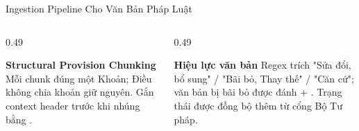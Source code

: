 \documentclass[aspectratio=1610,10pt,xcolor={table}]{beamer}
\begin{document}
\begin{frame}{Ingestion Pipeline Cho Văn Bản Pháp Luật}
  \vspace{0.15cm}
  \begin{columns}[t]
    \begin{column}{0.49\textwidth}
      \begin{block}{\textbf{Structural Provision Chunking}}
        \scriptsize Mỗi chunk đúng một Khoản; Điều không chia khoản giữ nguyên. Gắn context header  trước khi nhúng bằng .
      \end{block}
    \end{column}
    \begin{column}{0.49\textwidth}
      \begin{block}{\textbf{Hiệu lực văn bản}}
        \scriptsize Regex trích "Sửa đổi, bổ sung" / "Bãi bỏ, Thay thế" / "Căn cứ"; văn bản bị bãi bỏ được đánh  + . Trạng thái được đồng bộ thêm từ cổng Bộ Tư pháp.
      \end{block}
    \end{column}
  \end{columns}
\end{frame}
\end{document}
